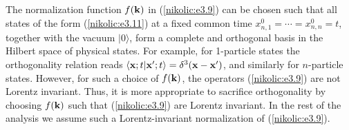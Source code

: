 \documentclass[12pt,twoside]{report} %
\begin{document}
The normalization function $f({\bf k})$ in (\ref{nikolic:e3.9}) can be chosen such that
all states of the form (\ref{nikolic:e3.11}) at a fixed common time 
$x^0_{n,1}= \cdots =x^0_{n,n}=t$, 
together with the vacuum $|0\rangle$, form
a complete and orthogonal basis in the Hilbert space of physical states.
For example, for 1-particle states the orthogonality relation reads
$\langle {\bf x};t|{\bf x}';t\rangle=\delta^3({\bf x}-{\bf x}')$,
and similarly for $n$-particle states. However, for such a choice of 
$f({\bf k})$, the operators (\ref{nikolic:e3.9}) are not Lorentz invariant.
Thus, it is more appropriate to sacrifice orthogonality by
choosing $f({\bf k})$ such that (\ref{nikolic:e3.9}) are Lorentz invariant. 
In the rest of the analysis we assume such a Lorentz-invariant
normalization of (\ref{nikolic:e3.9}). 
\end{document}
